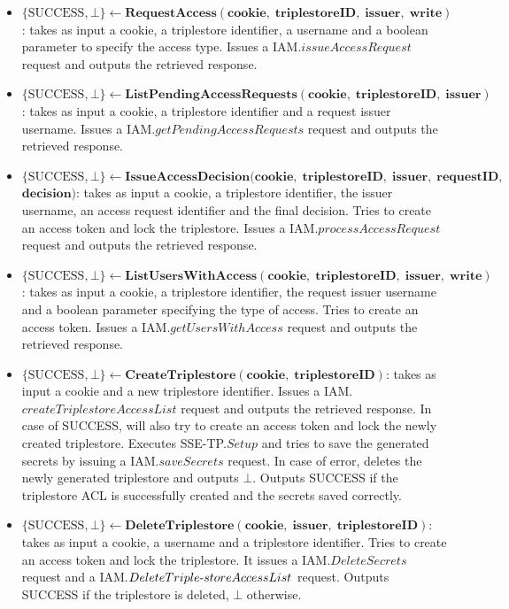 \begin{definition}
\begin{itemize}
        \item $\{\textrm{SUCCESS}, \bot\} \leftarrow \mathbf{RequestAccess(cookie, \;  triplestoreID, \; issuer, \; write)}$: takes as input a cookie, a triplestore identifier, a username and a boolean parameter to specify the access type. Issues a IAM.$issueAccessRequest$ request and outputs the retrieved response.

        \item $\{\textrm{SUCCESS}, \bot\} \leftarrow \mathbf{ListPendingAccessRequests(cookie, \;  triplestoreID, \; issuer)}$: takes as input a cookie, a triplestore identifier and a request issuer username. Issues a IAM.$getPendingAccessRequests$ request and outputs the retrieved response.

        \item $\{\textrm{SUCCESS}, \bot\} \leftarrow \mathbf{IssueAccessDecision(cookie, \;  triplestoreID, \; issuer, \; requestID, }$\linebreak $\mathbf{ decision)}$: takes as input a cookie, a triplestore identifier, the issuer username, an access request identifier and the final decision. Tries to create an access token and lock the triplestore. Issues a IAM.$processAccessRequest$ request and outputs the retrieved response.

        \item $\{\textrm{SUCCESS}, \bot\} \leftarrow \mathbf{ListUsersWithAccess(cookie, \;  triplestoreID, \; issuer, \; write)}$: takes as input a cookie, a triplestore identifier, the request issuer username and a boolean parameter specifying the type of access. Tries to create an access token. Issues a IAM.$getUsersWithAccess$ request and outputs the retrieved response.

        \item $\{\textrm{SUCCESS}, \bot\} \leftarrow \mathbf{CreateTriplestore(cookie, \; triplestoreID)}$: takes as input a cookie and a new triplestore identifier. Issues a IAM.$createTriplestoreAccessList$ request and outputs the retrieved response. In case of SUCCESS, will also try to create an access token and lock the newly created triplestore. Executes SSE-TP.$Setup$ and tries to save the generated secrets by issuing a IAM.$saveSecrets$ request. In case of error, deletes the newly generated triplestore and outputs $\bot$. Outputs SUCCESS if the triplestore \gls{ACL} is successfully created and the secrets saved correctly.

        \item $\{\textrm{SUCCESS}, \bot\} \leftarrow \mathbf{DeleteTriplestore(cookie, \; issuer, \;  triplestoreID)}$: takes as input a cookie, a username and a triplestore identifier. Tries to create an access token and lock the triplestore. It issues a IAM.$DeleteSecrets$ request and a IAM.$DeleteTriple\textrm{-}\linebreak storeAccessList$ request. Outputs SUCCESS if the triplestore is deleted, $\bot$ otherwise.


\end{itemize}
\end{definition}
